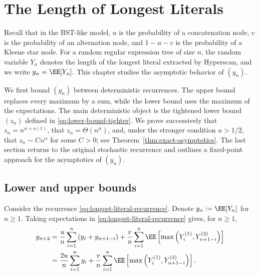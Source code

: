 \chapter{The Length of Longest Literals}
\label{chap:length-of-longest-literals}


Recall that in the BST-like model, $u$ is the probability of a concatenation node, $v$ is the probability of an alternation node, and $1-u-v$ is the probability of a Kleene star node. For a random regular expression tree of size $n$, the random variable $Y_n$ denotes the length of the longest literal extracted by Hyperscan, and we write $y_n=\EE[Y_n]$. This chapter studies the asymptotic behavior of $(y_n)$.

We first bound $(y_n)$ between deterministic recurrences. The upper bound replaces every maximum by a sum, while the lower bound uses the maximum of the expectations. The main deterministic object is the tightened lower bound $(z_n)$ defined in \eqref{eq:lower-bound-tighter}. We prove successively that $z_n=n^{\alpha+o(1)}$, that $z_n=\Theta(n^\alpha)$, and, under the stronger condition $u>1/2$, that $z_n\sim Cn^\alpha$ for some $C>0$; see Theorem~\ref{thm:exact-asymptotics}. The last section returns to the original stochastic recurrence and outlines a fixed-point approach for the asymptotics of $(y_n)$.

\section{Lower and upper bounds}

Consider the recurrence \eqref{eq:longest-literal-recurrence}. Denote $y_n := \EE[Y_n]$ for $n \ge 1$. Taking expectations in \eqref{eq:longest-literal-recurrence} gives, for $n \ge 1$,
\begin{equation}
  \label{eq:expected-longest-literal-recurrence}
  \begin{aligned}
    y_{n+2}
     & = \dfrac{u}{n}\sum\limits_{i=1}^n\left(y_{i} + y_{n+1-i}\right) + \dfrac{v}{n}\sum\limits_{i=1}^n\EE\left[\max\left(Y_{i}^{(1)}, Y_{n+1-i}^{(2)}\right)\right] \\
     & = \dfrac{2u}{n}\sum\limits_{i=1}^n y_{i} + \dfrac{v}{n}\sum\limits_{i=1}^n\EE\left[\max\left(Y_{i}^{(1)}, Y_{n+1-i}^{(2)}\right)\right].
  \end{aligned}
\end{equation}

